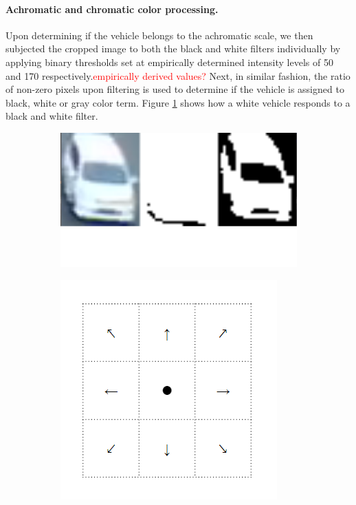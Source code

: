 \documentclass[runningheads]{llncs}
\newcommand{\ian}[1]{\textcolor{red}{#1}}
\newcommand{\ian}[1]{}   %
\begin{document}
\paragraph{Achromatic and chromatic color processing.} Upon determining if the vehicle belongs to the achromatic scale, we then subjected the cropped image to both the black and white filters individually by applying binary thresholds set at empirically determined intensity levels of 50 and 170 respectively.\ian{empirically derived values?} Next, in similar fashion, the ratio of non-zero pixels upon filtering is used to determine if the vehicle is assigned to black, white or gray color term. Figure \ref{fig:blackwhite_filter} shows how a white vehicle responds to a black and white filter. 

\begin{figure}[t!]
\centering
\begin{subfigure}[t]{0.35\textwidth}
\includegraphics[width=\textwidth]{Images/blackwhite_filter42.PNG}
\caption{} \label{fig:blackwhite_filter}
\end{subfigure}
\begin{subfigure}[t]{0.3\textwidth}
\includegraphics[width=\textwidth]{Images/motion.PNG}

\end{subfigure}
\end{figure}
\end{document}
